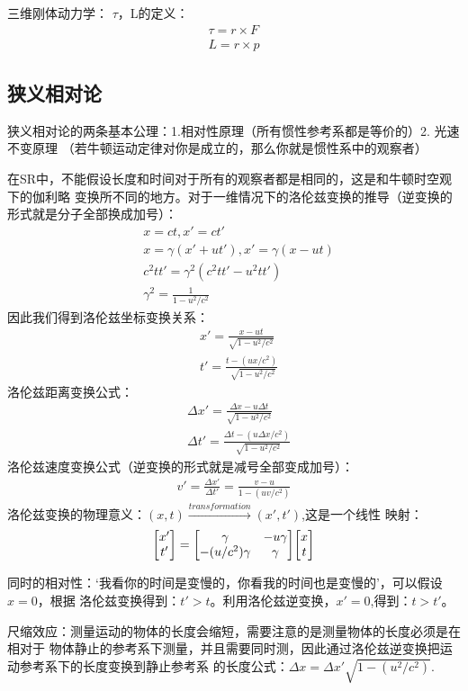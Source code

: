 \documentclass[UTF8]{article}
\numberwithin{equation}{section}
\begin{document}
三维刚体动力学：
$\tau$，L的定义：
\begin{align*}
    \tau = r\times F\\
    L=r\times p
\end{align*}
\subsection{狭义相对论}
狭义相对论的两条基本公理：1.相对性原理（所有惯性参考系都是等价的）2. 光速不变原理
（若牛顿运动定律对你是成立的，那么你就是惯性系中的观察者）

在SR中，不能假设长度和时间对于所有的观察者都是相同的，这是和牛顿时空观下的伽利略
变换所不同的地方。对于一维情况下的洛伦兹变换的推导（逆变换的形式就是分子全部换成加号）：
\begin{align*}
    &x=ct,x'=ct'\\
    &x=\gamma(x'+u t'),x'=\gamma(x-u t)\\
    &c^2tt' = \gamma^2 (c^2 tt'-u^2 tt')\\
    &\gamma^2 = \frac{1}{1-u^2/c^2}
\end{align*}
因此我们得到洛伦兹坐标变换关系：
\begin{align*}
    &x'=\frac{x-u t}{\sqrt{1-u^2/c^2}}\\
    &t'=\frac{t-(ux/c^2)}{\sqrt[]{1-u^2/c^2}}
\end{align*}
洛伦兹距离变换公式：
\begin{align*}
    &\Delta x'=\frac{\Delta x-u \Delta t}{\sqrt{1-u^2/c^2}}\\
    &\Delta t'=\frac{\Delta t-(u\Delta x/c^2)}{\sqrt[]{1-u^2/c^2}}
\end{align*}
洛伦兹速度变换公式（逆变换的形式就是减号全部变成加号）：
\begin{align*}
    v'=\frac{\Delta x'}{\Delta t'}=\frac{v-u}{1-(uv/c^2)}
\end{align*}
洛伦兹变换的物理意义：$(x,t)\xrightarrow{transformation} (x',t')$,这是一个线性
映射：
\begin{align*}
    \mqty[x'\\t']=\mqty[\gamma&-u\gamma\\ -(u/c^2)\gamma&\gamma]\mqty[x\\t]
\end{align*}

同时的相对性：‘我看你的时间是变慢的，你看我的时间也是变慢的’，可以假设$x=0$，根据
洛伦兹变换得到：$t'>t$。利用洛伦兹逆变换，$x'=0$,得到：$t>t'$。

尺缩效应：测量运动的物体的长度会缩短，需要注意的是测量物体的长度必须是在相对于
物体静止的参考系下测量，并且需要同时测，因此通过洛伦兹逆变换把运动参考系下的长度变换到静止参考系
的长度公式：$\Delta x = \Delta x' \sqrt{1-(u^2/c^2)}$.
\end{document}
